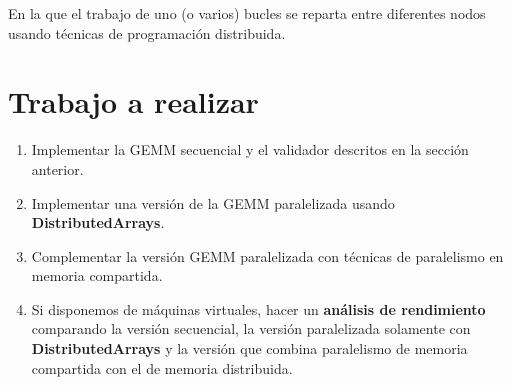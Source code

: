 \documentclass[a4paper]{article}
\begin{document}
En la que el trabajo de uno (o varios) bucles se reparta entre diferentes nodos usando técnicas
de programación distribuida.

\section{Trabajo a realizar}
\label{sec:org9d583af}

\begin{enumerate}
\item Implementar la GEMM secuencial y el validador descritos en la sección anterior.
\item Implementar una versión de la GEMM paralelizada usando \textbf{DistributedArrays}.
\item Complementar la versión GEMM paralelizada con técnicas de paralelismo en memoria compartida.
\item Si disponemos de máquinas virtuales, hacer un \textbf{análisis de rendimiento} comparando la versión secuencial,
la versión paralelizada solamente con \textbf{DistributedArrays} y la versión que combina paralelismo de memoria
compartida con el de memoria distribuida.
\end{enumerate}
\end{document}
